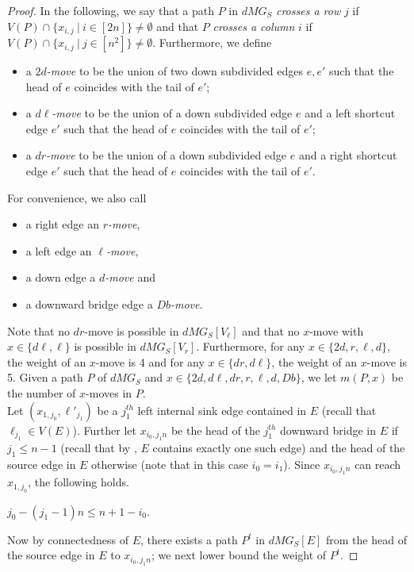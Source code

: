 \begin{proof}
In the following, we say that a path $P$ in $dMG_S$ \emph{crosses a row} $j$ if $V(P) \cap \{x_{i,j}~|~i \in [2n]\} \neq \emptyset$ and that $P$ \emph{crosses a column} $i$ if $V(P) \cap \{x_{i,j}~|~j \in [n^2]\} \neq \emptyset$. Furthermore, we define
\begin{itemize}
\item a \emph{$2d$-move} to be the union of two down subdivided edges $e,e'$ such that the head of $e$ coincides with the tail of $e'$;
\item a \emph{$d\ell$-move} to be the union of a down subdivided edge $e$ and a left shortcut edge $e'$ such that the head of $e$ coincides with the tail of $e'$;
\item a \emph{$dr$-move} to be the union of a down subdivided edge $e$ and a right shortcut edge $e'$ such that the head of $e$ coincides with the tail of $e'$. 
\end{itemize}
For convenience, we also call
\begin{itemize}
\item a right edge an \emph{$r$-move},
\item a left edge an \emph{$\ell$-move},
\item a down edge a \emph{$d$-move} and
\item a downward bridge edge a \emph{$Db$-move}.
\end{itemize}
Note that no $dr$-move is possible in $dMG_S[V_\ell]$ and that no $x$-move with $x \in \{d\ell,\ell\}$ is possible in $dMG_S[V_r]$. Furthermore, for any $x \in \{2d,r,\ell,d\}$, the weight of an $x$-move is 4 and for any $x \in \{dr,d\ell\}$, the weight of an $x$-move is 5. Given a path $P$ of $dMG_S$ and $x \in \{2d,d\ell,dr,r,\ell,d,Db\}$, we let $m(P,x)$ be the number of $x$-moves in $P$.\\

Let $(x_{1,j_0},\ell'_{j_1})$ be a $j_1^{th}$ left internal sink edge contained in $E$ (recall that $\ell_{j_1} \in V(E)$). Further let $x_{i_0,j_1n}$ be the head of the $j_1^{th}$ downward bridge in $E$ if $j_1 \leq n-1$ (recall that by , $E$ contains exactly one such edge) and the head of the source edge in $E$ otherwise (note that in this case $i_0 = i_1$). Since $x_{i_0,j_1n}$ can reach $x_{1,j_0}$, the following holds.

\begin{observation}
\label{obs:i0j0}
$j_0 - (j_1-1)n \leq n+1-i_0$.
\end{observation}

Now by connectedness of $E$, there exists a path $P^t$ in $dMG_S[E]$ from the head of the source edge in $E$ to $x_{i_0,j_1n}$; we next lower bound the weight of $P^t$.


\end{proof}
